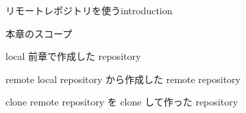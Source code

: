 % 
% 
% 
% 

\begin{frame}[t]{リモートレポジトリを使う}{introduction}

  本章のスコープ
  \vspace{4ex}

  \begin{block}{local}
    前章で作成した repository
  \end{block}

  \begin{block}{remote}
    local repository から作成した remote repository
  \end{block}

  \begin{block}{clone}
    remote repository を clone して作った repository
  \end{block}

\end{frame}
